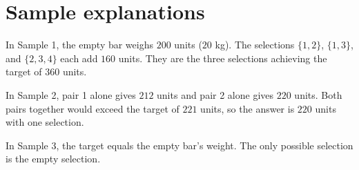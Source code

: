\section*{Sample explanations}
In Sample 1, the empty bar weighs $200$ units ($20$ kg).
The selections $\{1,2\}$, $\{1,3\}$, and $\{2,3,4\}$ each add $160$
units. They are the three selections achieving the target of $360$ units.

In Sample 2, pair 1 alone gives $212$ units and pair 2 alone gives $220$
units. Both pairs together would exceed the target of $221$ units, so the
answer is $220$ units with one selection.

In Sample 3, the target equals the empty bar's weight. The only possible
selection is the empty selection.
